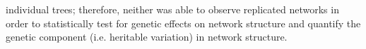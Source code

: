 \documentclass{article}
\begin{document}
%
%
%
%
%
%
individual trees; therefore, neither was able to observe replicated
networks in order to statistically test for genetic effects on network
structure and quantify the genetic component (i.e. heritable
variation) in network structure.
\end{document}

